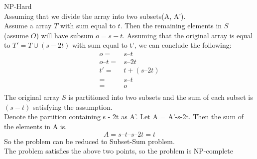 \documentclass{article}
\begin{document}
NP-Hard\\
Assuming that we divide the array into two subsets(A, A').\\
Assume a array $T$ with sum equal to $t$. Then the remaining elements in $S$ (assume $O$) will have subsum $o = s - t$. Assuming that the original array is equal to $T' = T \cup (s - 2t)$ with sum equal to t', we can conclude the following:
\begin{equation*}
\begin{aligned}
o =& s – t \\
o – t =& s – 2t \\
t' =& t + (s – 2t) \\
=& s – t \\
=& o \\
\end{aligned}
\end{equation*}
The original array $S$ is partitioned into two subsets and the sum of each subset is $(s - t)$ satisfying the assumption.\\
Denote the partition containing {s - 2t} as A'. Let A = A'-{s-2t}. Then the sum of the elements in A is.
$$
A = s – t – {s – 2t} = t
$$
So the problem can be reduced to Subset-Sum problem.\\

The problem satisfies the above two points, so the problem is NP-complete
\end{document}
